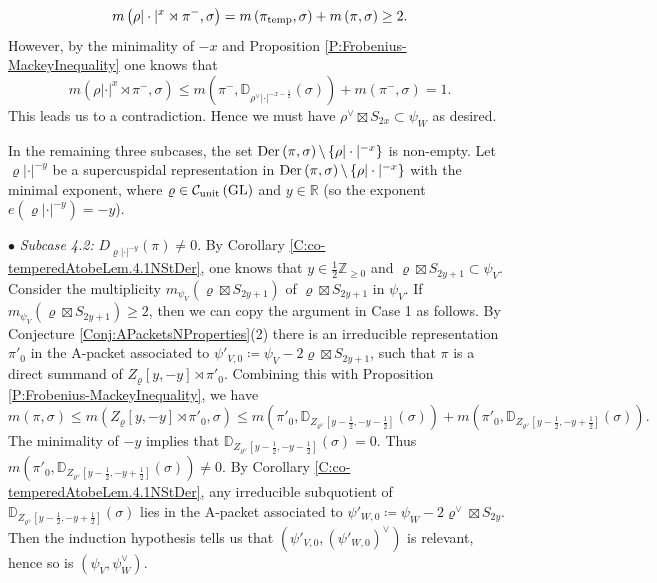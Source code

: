 \documentclass[11pt,letterpaper]{amsart}
\theoremstyle{plain}
\numberwithin{theorem}{section}
\numberwithin{equation}{subsection}
\theoremstyle{remark}
\newcommand{\GL}{\operatorname{GL}}
\newcommand{\D}{\mathbb{D}}
\newcommand{\Z}{\mathbb{Z}}
\newcommand{\R}{\mathbb{R}}
\newcommand{\unit}{{\rm unit}}
\def\calC{\mathcal{C}}
\def\Der{{\rm Der}} %
\begin{document}
\[
    m\left(\rho|\cdot|^x\rtimes \pi^-,\sigma\right) = m\left(\pi_{\rm temp},\sigma\right) + m\left(\pi,\sigma\right)\geq 2.
\]
However, by the minimality of $-x$ and Proposition \ref{P:Frobenius-MackeyInequality} one knows that
\[
    m\left(\rho|\cdot|^x\rtimes \pi^-,\sigma\right) \leq m\left(\pi^-,\D_{\rho^\vee|\cdot|^{-x-\frac{1}{2}}}\left(\sigma\right)\right) + m\left(\pi^-,\sigma\right)=1.
\]
This leads us to a contradiction. Hence we must have $\rho^\vee\boxtimes S_{2x}\subset \psi_W$ as desired.

\vskip 5pt

In the remaining three subcases, the set $\Der\left(\pi,\sigma\right)\backslash\left\{\rho|\cdot|^{-x}\right\}$ is non-empty. Let $\varrho|\cdot|^{-y}$ be a supercuspidal representation in $\Der\left(\pi,\sigma\right)\backslash\left\{\rho|\cdot|^{-x}\right\}$ with the minimal exponent, where $\varrho\in\calC_{\unit}\left(\GL\right)$ and $y\in\R$ (so the exponent $e\left(\varrho|\cdot|^{-y}\right)=-y$).

\vskip 5pt

$\bullet$\textit{ Subcase 4.2:} $D_{\varrho|\cdot|^{-y}}\left(\pi\right)\neq0$. By Corollary \ref{C:co-temperedAtobeLem.4.1NStDer}, one knows that $y\in\frac{1}{2}\Z_{\geq 0}$ and $\varrho\boxtimes S_{2y+1}\subset\psi_V$. Consider the multiplicity $m_{\psi_V}\left(\varrho\boxtimes S_{2y+1}\right)$ of $\varrho\boxtimes S_{2y+1}$ in $\psi_V$. If $m_{\psi_V}\left(\varrho\boxtimes S_{2y+1}\right)\geq 2$, then we can copy the argument in Case 1 as follows. By Conjecture \ref{Conj:APacketsNProperties}(2) there is an irreducible representation $\pi'_0$ in the A-packet associated to $\psi'_{V,0}\coloneqq \psi_V - 2\varrho\boxtimes S_{2y+1}$, such that $\pi$ is a direct summand of $Z_{\varrho}\left[y,-y\right]\rtimes \pi'_0$. Combining this with Proposition \ref{P:Frobenius-MackeyInequality}, we have
\[
    m\left(\pi,\sigma\right)\leq m\left(Z_{\varrho}\left[y,-y\right]\rtimes \pi'_0,\sigma\right) \leq m\left(\pi'_0, \D_{Z_{\varrho^\vee}\left[y-\frac{1}{2},-y-\frac{1}{2}\right]}\left(\sigma\right)\right) + m\left(\pi'_0, \D_{Z_{\varrho^\vee}\left[y-\frac{1}{2},-y+\frac{1}{2}\right]}\left(\sigma\right)\right).
\]
The minimality of $-y$ implies that $\D_{Z_{\varrho^\vee}\left[y-\frac{1}{2},-y-\frac{1}{2}\right]}\left(\sigma\right)=0$. Thus $m\left(\pi'_0, \D_{Z_{\varrho^\vee}\left[y-\frac{1}{2},-y+\frac{1}{2}\right]}\left(\sigma\right)\right)\neq 0$. By Corollary \ref{C:co-temperedAtobeLem.4.1NStDer}, any irreducible subquotient of $\D_{Z_{\varrho^\vee}\left[y-\frac{1}{2},-y+\frac{1}{2}\right]}\left(\sigma\right)$ lies in the A-packet associated to $\psi'_{W,0}\coloneqq \psi_W - 2\varrho^\vee\boxtimes S_{2y}$. Then the induction hypothesis tells us that $\left(\psi'_{V,0},\left(\psi'_{W,0}\right)^\vee\right)$ is relevant, hence so is $\left(\psi_V,\psi_W^\vee\right)$.
\end{document}
